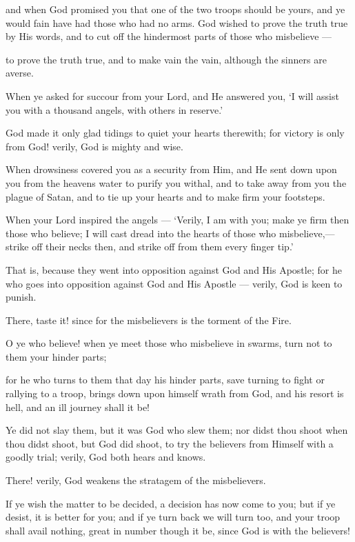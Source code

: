 \documentclass[fontsize=14pt, letterpaper, notitlepage, openany, DIV=12]{scrbook} %
\begin{document}
\noindent[8:7]
and when God promised you that one of the two troops should be yours, and ye would
fain have had those who had no arms. God wished to prove the truth true by His words, and to
cut off the hindermost parts of those who misbelieve ---

\noindent[8:8]
to prove the truth true, and to make vain the vain, although the sinners are averse.

\noindent[8:9]
When ye asked for succour from your Lord, and He answered you, `I will assist you with
a thousand angels, with others in reserve.'

\noindent[8:10]
God made it only glad tidings to quiet your hearts therewith; for victory is only from
God! verily, God is mighty and wise.

\noindent[8:11]
When drowsiness covered you as a security from Him, and He sent down upon you from
the heavens water to purify you withal, and to take away from you the plague of Satan, and to tie
up your hearts and to make firm your footsteps.

\noindent[8:12]
When your Lord inspired the angels --- `Verily, I am with you; make ye firm then those
who believe; I will cast dread into the hearts of those who misbelieve,--- strike off their necks
then, and strike off from them every finger tip.'

\noindent[8:13]
That is, because they went into opposition against God and His Apostle; for he who goes
into opposition against God and His Apostle --- verily, God is keen to punish.

\noindent[8:14]
There, taste it! since for the misbelievers is the torment of the Fire.

\noindent[8:15]
O ye who believe! when ye meet those who misbelieve in swarms, turn not to them your
hinder parts;

\noindent[8:16]
for he who turns to them that day his hinder parts, save turning to fight or rallying to a
troop, brings down upon himself wrath from God, and his resort is hell, and an ill journey shall it
be!

\noindent[8:17]
Ye did not slay them, but it was God who slew them; nor didst thou shoot when thou
didst shoot, but God did shoot, to try the believers from Himself with a goodly trial; verily, God
both hears and knows.

\noindent[8:18]
There! verily, God weakens the stratagem of the misbelievers.

\noindent[8:19]
If ye wish the matter to be decided, a decision has now come to you; but if ye desist, it is
better for you; and if ye turn back we will turn too, and your troop shall avail nothing, great in
number though it be, since God is with the believers!
\end{document}
